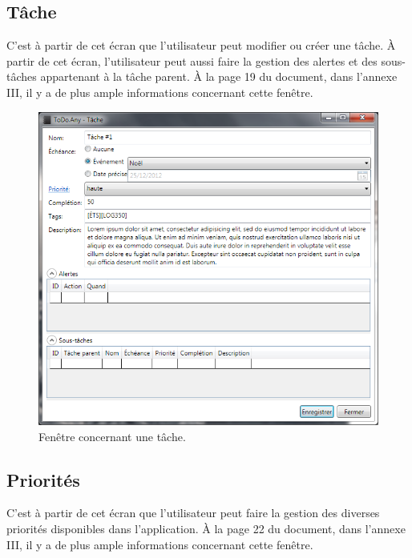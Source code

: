 \documentclass[letterpaper, oneside, 12pt, these, creativecommons]{thETS}
\begin{document}
\newpage

\subsection{Tâche}

C'est à partir de cet écran que l'utilisateur peut modifier ou créer une tâche. À partir de cet écran, l'utilisateur peut aussi faire la gestion des alertes et des sous-tâches appartenant à la tâche parent. À la page 19 du document, dans l'annexe III, il y a de plus ample informations concernant cette fenêtre.

\begin{figure}[H!]
	\centering
	\includegraphics[width=1\textwidth]{fenetre_tache.png}
	\caption{Fenêtre concernant une tâche.}
\end{figure}

\newpage

\subsection{Priorités}

C'est à partir de cet écran que l'utilisateur peut faire la gestion des diverses priorités disponibles dans l'application. À la page 22 du document, dans l'annexe III, il y a de plus ample informations concernant cette fenêtre.
\end{document}
